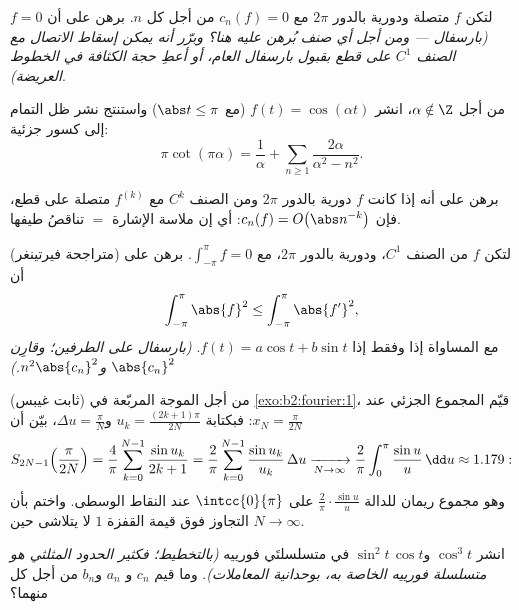\begin{exercise}[$\star\star$]\label{exo:b2:fourier:4}
لتكن $f$ متصلة ودورية بالدور $2\pi$ مع $c_n(f) = 0$ من أجل كل
$n$. برهن على أن $f = 0$ \emph{(بارسفال --- ومن أجل أي صنف بُرهن عليه
هنا؟ وبرّر أنه يمكن إسقاط الاتصال مع الصنف $C^1$ على قطع
بقبول بارسفال العام، أو أعطِ حجة الكثافة في
الخطوط العريضة)}.
\end{exercise}

\begin{exercise}[$\star\star$]\label{exo:b2:fourier:5}
من أجل $\alpha \notin \Z$، انشر $f(t) = \cos(\alpha t)$ (مع $\abs t
\leq \pi$) واستنتج نشر ظل التمام إلى كسور جزئية:
\[
\pi\cot(\pi\alpha) = \frac{1}{\alpha} + \sum_{n\geq1}
\frac{2\alpha}{\alpha^2 - n^2} .
\]
\end{exercise}

\begin{exercise}[$\star\star$]\label{exo:b2:fourier:6}
برهن على أنه إذا كانت $f$ دورية بالدور $2\pi$ ومن الصنف $C^k$ مع $f^{(k)}$
متصلة على قطع، فإن $c_n(f) = O\bigl(\abs n^{-k}\bigr)$:
أي إن ملاسة الإشارة $=$ تناقصُ طيفها.
\end{exercise}

\begin{exercise}[$\star\star\star$]\label{exo:b2:fourier:7}
(متراجحة فيرتينغر) لتكن $f$ من الصنف $C^1$، ودورية بالدور $2\pi$، مع
$\int_{-\pi}^{\pi} f = 0$. برهن على أن
\[
\int_{-\pi}^{\pi} \abs{f}^2 \leq \int_{-\pi}^{\pi} \abs{f'}^2 ,
\]
مع المساواة إذا وفقط إذا $f(t) = a\cos t + b\sin t$. \emph{(بارسفال على
الطرفين؛ وقارِن $\abs{c_n}^2$ و$n^2\abs{c_n}^2$.)}
\end{exercise}

\begin{exercise}[$\star\star\star$]\label{exo:b2:fourier:8}
(ثابت غيبس) من أجل الموجة المربّعة في
\cref{exo:b2:fourier:1}، قيّم المجموع الجزئي عند $x_N =
\frac{\pi}{2N}$: فبكتابة $u_k = \frac{(2k+1)\pi}{2N}$ و$\Delta u
= \frac{\pi}{N}$، بيّن أن
\[
S_{2N-1}\Bigl(\frac{\pi}{2N}\Bigr)
= \frac{4}{\pi}\sum_{k=0}^{N-1} \frac{\sin u_k}{2k+1}
= \frac{2}{\pi}\sum_{k=0}^{N-1} \frac{\sin u_k}{u_k}\,\Delta u
\xrightarrow[N\to\infty]{}
\frac{2}{\pi}\int_0^{\pi}\frac{\sin u}{u}\,\dd u \approx 1.179 :
\]
وهو مجموع ريمان للدالة $\frac{2}{\pi}\cdot\frac{\sin u}{u}$ على
$\intcc{0}{\pi}$ عند النقاط الوسطى. واختم بأن التجاوز فوق
قيمة القفزة $1$ لا يتلاشى حين $N \to \infty$.
\end{exercise}

\begin{exercise}[$\star$]\label{exo:b2:fourier:9}
انشر $\cos^3 t$ و$\sin^2 t\,\cos t$ في متسلسلتَي فورييه
\emph{(بالتخطيط؛ فكثير الحدود المثلثي هو متسلسلة فورييه
الخاصة به، بوحدانية المعاملات)}. وما قيم $c_n$ و
$a_n$ و$b_n$ من أجل كل منهما؟
\end{exercise}

